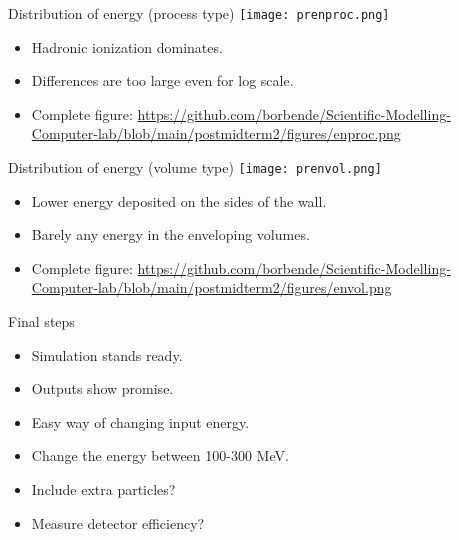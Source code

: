\documentclass[11pt]{beamer}
\begin{document}
\begin{frame}{Distribution of energy (process type)}
        \centering
    \texttt{[image: prenproc.png]}
    \begin{itemize}
    \vspace{0.2 cm}
        \item<tri@1-> Hadronic ionization dominates.
        \item<tri@1-> Differences are too large even for log scale.
        \item<tri@1-> Complete figure: \url{https://github.com/borbende/Scientific-Modelling-Computer-lab/blob/main/postmidterm2/figures/enproc.png}
    \end{itemize}
\end{frame}

\begin{frame}{Distribution of energy (volume type)}
        \centering
    \texttt{[image: prenvol.png]}
    \begin{itemize}
    \vspace{0.2 cm}
        \item<tri@1-> Lower energy deposited on the sides of the wall.
        \vspace{0.2 cm}
        \item<tri@1-> Barely any energy in the enveloping volumes.
        \vspace{0.2 cm}
        \item<tri@1-> Complete figure: \url{https://github.com/borbende/Scientific-Modelling-Computer-lab/blob/main/postmidterm2/figures/envol.png}
    \end{itemize}
\end{frame}

\begin{frame}{Final steps}
    \begin{itemize}
        \item<tri@1-> Simulation stands ready.
        \vspace{0.2 cm}
        \item<tri@1-> Outputs show promise.
        \vspace{0.2 cm}
        \item<tri@1-> Easy way of changing input energy.
        \vspace{0.2 cm}
        \item<square@1-> Change the energy between 100-300 MeV.
        \vspace{0.2 cm}
        \item<square@1-> Include extra particles?
        \vspace{0.2 cm}
        \item<square@1-> Measure detector efficiency?
    \end{itemize}
\end{frame}
\end{document}
